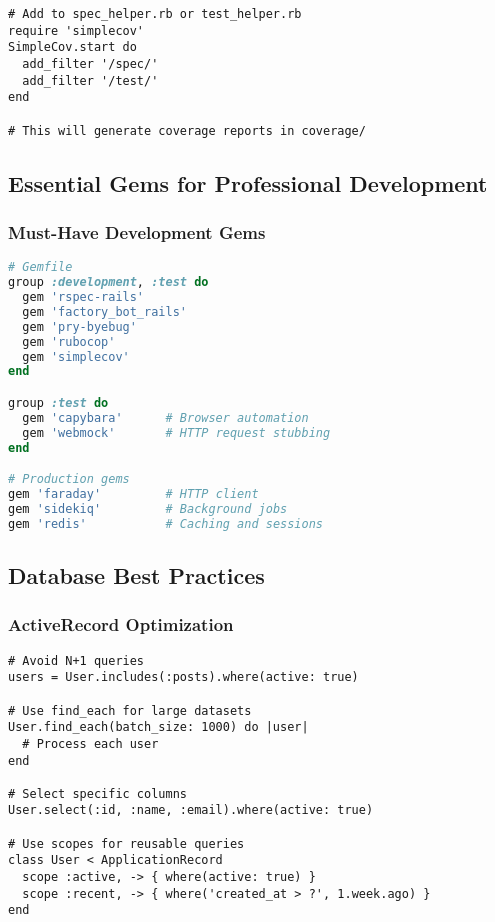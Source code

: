 \documentclass[12pt,a4paper]{article}
\begin{document}
\begin{lstlisting}
# Add to spec_helper.rb or test_helper.rb
require 'simplecov'
SimpleCov.start do
  add_filter '/spec/'
  add_filter '/test/'
end

# This will generate coverage reports in coverage/
\end{lstlisting}

\subsection{Essential Gems for Professional Development}

\subsubsection{Must-Have Development Gems}

\begin{lstlisting}[language=ruby]
# Gemfile
group :development, :test do
  gem 'rspec-rails'
  gem 'factory_bot_rails'
  gem 'pry-byebug'
  gem 'rubocop'
  gem 'simplecov'
end

group :test do
  gem 'capybara'      # Browser automation
  gem 'webmock'       # HTTP request stubbing
end

# Production gems
gem 'faraday'         # HTTP client
gem 'sidekiq'         # Background jobs
gem 'redis'           # Caching and sessions
\end{lstlisting}

\subsection{Database Best Practices}

\subsubsection{ActiveRecord Optimization}

\begin{lstlisting}
# Avoid N+1 queries
users = User.includes(:posts).where(active: true)

# Use find_each for large datasets
User.find_each(batch_size: 1000) do |user|
  # Process each user
end

# Select specific columns
User.select(:id, :name, :email).where(active: true)

# Use scopes for reusable queries
class User < ApplicationRecord
  scope :active, -> { where(active: true) }
  scope :recent, -> { where('created_at > ?', 1.week.ago) }
end
\end{lstlisting}
\end{document}
